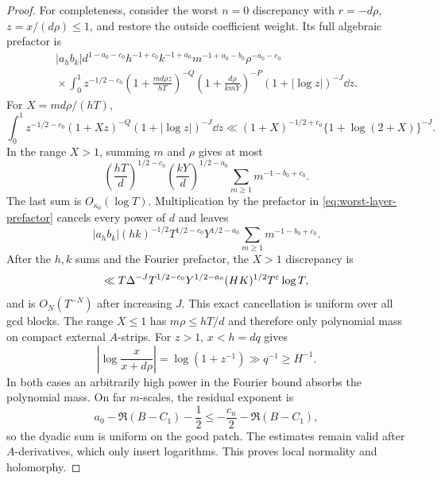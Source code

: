 \begin{proof}
For completeness, consider the worst $n=0$ discrepancy with
$r=-d\rho$, $z=x/(d\rho)\leq1$, and restore the outside coefficient weight.
Its full algebraic prefactor is
\begin{multline}
 |a_hb_k|d^{1-a_0-c_0}h^{-1+c_0}k^{-1+a_0}
 m^{-1+a_0-b_0}\rho^{-a_0-c_0}\\
 {}\times\int_0^1z^{-1/2-c_0}
 \left(1+\frac{md\rho z}{hT}\right)^{-Q}
 \left(1+\frac{d\rho}{kmY}\right)^{-P}
 (1+|\log z|)^{-J}\dd z.
 \label{eq:worst-layer-prefactor}
\end{multline}
For $X=md\rho/(hT)$,
\begin{equation}\label{eq:z-integral-bound}
 \int_0^1z^{-1/2-c_0}(1+Xz)^{-Q}(1+|\log z|)^{-J}\dd z
 \ll(1+X)^{-1/2+c_0}\{1+\log(2+X)\}^{-J}.
\end{equation}
In the range $X>1$, summing $m$ and $\rho$ gives at most
\begin{equation}\label{eq:mrho-bound}
 \left(\frac{hT}{d}\right)^{1/2-c_0}
 \left(\frac{kY}{d}\right)^{1/2-a_0}
 \sum_{m\geq1}m^{-1-b_0+c_0}.
\end{equation}
The last sum is $O_{\kappa_0}(\log T)$.  Multiplication by the prefactor in
\eqref{eq:worst-layer-prefactor} cancels every power of $d$ and leaves
\begin{equation}\label{eq:d-cancellation}
 |a_hb_k|(hk)^{-1/2}T^{1/2-c_0}Y^{1/2-a_0}
 \sum_{m\geq1}m^{-1-b_0+c_0}.
\end{equation}
After the $h,k$ sums and the Fourier prefactor, the $X>1$ discrepancy is
\begin{equation}\label{eq:full-worst-layer-bound}
 \ll T\Delta^{-J}T^{1/2-c_0}Y^{1/2-a_0}
 (HK)^{1/2}T^\varepsilon\log T,
\end{equation}
and is $O_N(T^{-N})$ after increasing $J$.  This exact cancellation is
uniform over all gcd blocks.  The range $X\leq1$
has $m\rho\leq hT/d$ and therefore only polynomial mass on compact external
$A$-strips.  For $z>1$, $x<h=dq$ gives
\begin{equation}\label{eq:z-large-phase}
 \left|\log\frac{x}{x+d\rho}\right|
 =\log(1+z^{-1})\gg q^{-1}\geq H^{-1}.
\end{equation}
In both cases an arbitrarily high power in the Fourier bound absorbs the
polynomial mass.  On far $m$-scales, the residual exponent is
\begin{equation}\label{eq:far-m-exponent}
 a_0-\Re(B-C_1)-\frac12
 \leq-\frac{c_u}{2}-\Re(B-C_1),
\end{equation}
so the dyadic sum is uniform on the good patch.  The estimates remain valid
after $A$-derivatives, which only insert logarithms.  This proves local
normality and holomorphy.
\end{proof}

